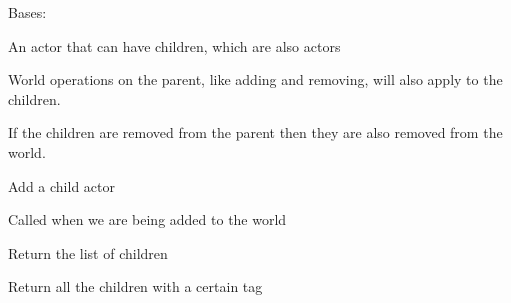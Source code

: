 \documentclass[letterpaper,10pt,english]{sphinxmanual}
\begin{document}
\begin{fulllineitems}
\label{actor:serge.actor.CompositeActor}
Bases: {\hyperref[actor:serge.actor.Actor]{}}

An actor that can have children, which are also actors

World operations on the parent, like adding and removing,
will also apply to the children.

If the children are removed from the parent then they are
also removed from the world.

\begin{fulllineitems}
\label{actor:serge.actor.CompositeActor.addChild}
Add a child actor

\end{fulllineitems}


\begin{fulllineitems}
\label{actor:serge.actor.CompositeActor.addedToWorld}
Called when we are being added to the world

\end{fulllineitems}


\begin{fulllineitems}
\label{actor:serge.actor.CompositeActor.getChildren}
Return the list of children

\end{fulllineitems}


\begin{fulllineitems}
\label{actor:serge.actor.CompositeActor.getChildrenWithTag}
Return all the children with a certain tag

\end{fulllineitems}



\end{fulllineitems}
\end{document}
